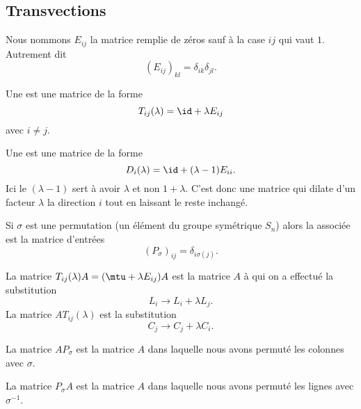 \subsection{Transvections}

Nous nommons \( E_{ij}\) la matrice remplie de zéros sauf à la case \( ij\) qui vaut \( 1\). Autrement dit
\begin{equation}
    (E_{ij})_{kl}=\delta_{ik}\delta_{jl}.
\end{equation}
\begin{definition}
    Une  est une matrice de la forme
    \begin{equation}
        T_{ij}(\lambda)=\id+\lambda E_{ij}
    \end{equation}
    avec \( i\neq j\).

    Une  est une matrice de la forme
    \begin{equation}
        D_i(\lambda)=\id+(\lambda-1)E_{ii}.
    \end{equation}
    Ici le \( (\lambda-1)\) sert à avoir \( \lambda\) et non \( 1+\lambda\). C'est donc une matrice qui dilate d'un facteur \( \lambda\) la direction \( i\) tout en laissant le reste inchangé.

    Si \( \sigma\) est une permutation (un élément du groupe symétrique \( S_n\)) alors la  associée est la matrice d'entrées
    \begin{equation}
        (P_{\sigma})_{ij}=\delta_{i\sigma(j)}.
    \end{equation}
\end{definition}

\begin{lemma}   \label{LemyrAXQs}
    La matrice \( T_{ij}(\lambda)A=(\mtu+\lambda E_{ij})A\) est la matrice \( A\) à qui on a effectué la substitution
    \begin{equation}
        L_i\to L_i+\lambda L_j.
    \end{equation}
    La matrice \( AT_{ij}(\lambda)\) est la substitution
    \begin{equation}
        C_j\to C_j+\lambda C_i.
    \end{equation}

    La matrice \( AP_{\sigma}\) est la matrice \( A\) dans laquelle nous avons permuté les colonnes avec \( \sigma\).

    La matrice \( P_{\sigma}A\) est la matrice \( A\) dans laquelle nous avons permuté les lignes avec \( \sigma^{-1}\).
\end{lemma}

